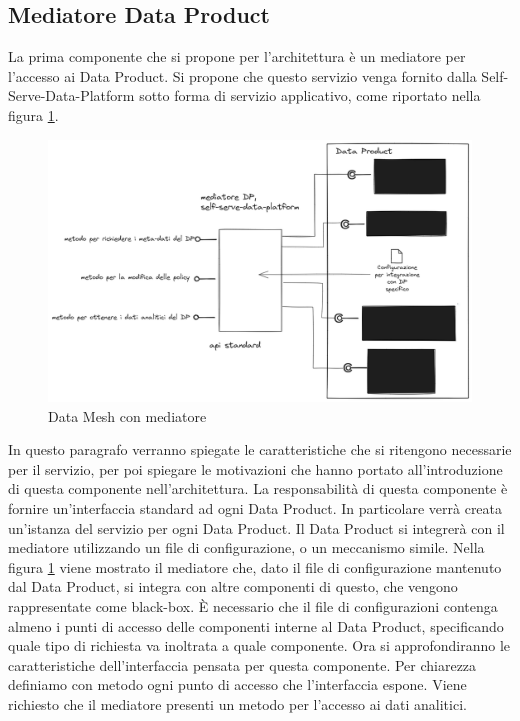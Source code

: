 \documentclass[12pt]{report}
\begin{document}
\subsection{Mediatore Data Product}
La prima componente che si propone per l'architettura è un mediatore per l'accesso ai Data Product.
Si propone che questo servizio venga fornito dalla Self-Serve-Data-Platform sotto forma di servizio applicativo, come riportato nella figura \ref{fig:dp solo mediatore}.
\begin{figure}
    \centering
    \includegraphics[width=\linewidth]{immagini/Data mesh con interfaccie.png}
    \caption{Data Mesh con mediatore}
    \label{fig:dp solo mediatore}
\end{figure}
In questo paragrafo verranno spiegate le caratteristiche che si ritengono necessarie per il servizio, per poi spiegare le motivazioni che hanno portato all'introduzione di questa componente nell'architettura.
La responsabilità di questa componente è fornire un'interfaccia standard ad ogni Data Product.
In particolare verrà creata un'istanza del servizio per ogni Data Product.
Il Data Product si integrerà con il mediatore utilizzando un file di configurazione, o un meccanismo simile.
Nella figura \ref{fig:dp solo mediatore}  viene mostrato il mediatore che, dato il file di configurazione mantenuto dal Data Product, si integra con altre componenti di questo, che vengono rappresentate come black-box.
È necessario che il file di configurazioni contenga almeno i punti di accesso delle componenti interne al Data Product, specificando quale tipo di richiesta va inoltrata a quale componente.
Ora si approfondiranno le caratteristiche  dell'interfaccia pensata per questa componente.
Per chiarezza definiamo con metodo ogni punto di accesso che l'interfaccia espone.
Viene richiesto che il mediatore presenti un metodo per l'accesso ai dati analitici.
\end{document}
